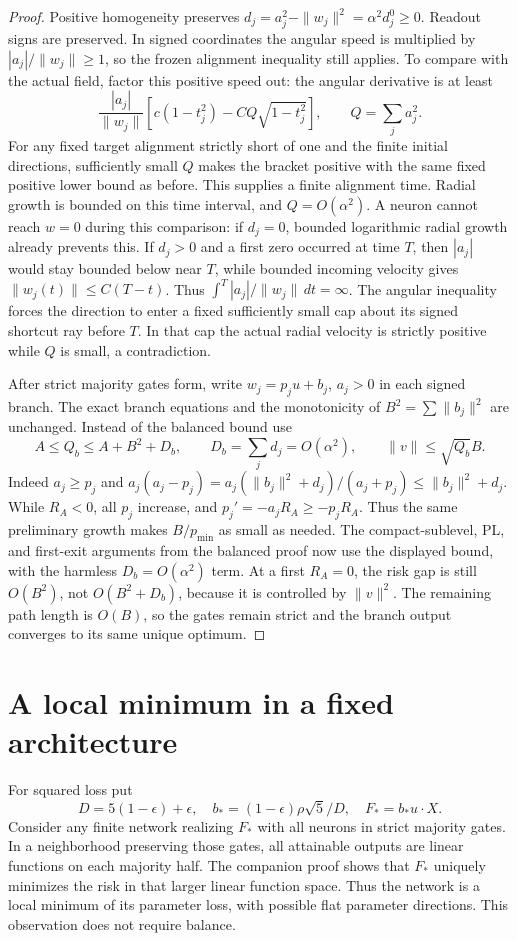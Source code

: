 \documentclass[11pt]{article}
\begin{document}
\begin{proof}
Positive homogeneity preserves
$d_j=a_j^2-\|w_j\|^2=\alpha^2d_j^0\ge0$.
Readout signs are preserved. In signed coordinates the angular speed
is multiplied by $|a_j|/\|w_j\|\ge1$, so the frozen alignment
inequality still applies. To compare with the actual field, factor
this positive speed out: the angular derivative is at least
\[
 \frac{|a_j|}{\|w_j\|}
 [c(1-t_j^2)-C Q\sqrt{1-t_j^2}],\qquad Q=\sum_j a_j^2.
\]
For any fixed target alignment strictly short of one and the finite
initial directions, sufficiently small $Q$ makes the bracket positive
with the same fixed positive lower bound as before. This supplies a
finite alignment time. Radial growth is bounded on this time interval,
and $Q=O(\alpha^2)$. A neuron cannot reach $w=0$ during this comparison:
if $d_j=0$, bounded logarithmic radial growth already prevents this.
If $d_j>0$ and a first zero occurred at time $T$, then $|a_j|$ would
stay bounded below near $T$, while bounded incoming velocity gives
$\|w_j(t)\|\le C(T-t)$. Thus
$\int^T|a_j|/\|w_j\|\,dt=\infty$. The angular inequality forces
the direction to enter a fixed sufficiently small cap about its signed
shortcut ray before $T$. In that cap the actual radial velocity is
strictly positive while $Q$ is small, a contradiction.

After strict majority gates form, write $w_j=p_j u+b_j$, $a_j>0$ in
each signed branch. The exact branch equations and the monotonicity of
$B^2=\sum\|b_j\|^2$ are unchanged. Instead of the balanced bound use
\[
 A\le Q_b\le A+B^2+D_b,\qquad
 D_b=\sum_jd_j=O(\alpha^2),\qquad
 \|v\|\le\sqrt{Q_b}B.
\]
Indeed $a_j\ge p_j$ and
$a_j(a_j-p_j)=a_j(\|b_j\|^2+d_j)/(a_j+p_j)
\le\|b_j\|^2+d_j$.
While $R_A<0$, all $p_j$ increase, and $p_j'=-a_jR_A\ge-p_jR_A$.
Thus the same preliminary growth makes $B/p_{\min}$ as small as
needed. The compact-sublevel, PL, and first-exit arguments from the
balanced proof now use the displayed bound, with the harmless
$D_b=O(\alpha^2)$ term. At a first $R_A=0$, the risk gap is still
$O(B^2)$, not $O(B^2+D_b)$, because it is controlled by $\|v\|^2$.
The remaining path length is $O(B)$, so the gates remain strict and
the branch output converges to its same unique optimum.
\end{proof}

\section{A local minimum in a fixed architecture}
For squared loss put
\[
 D=5(1-\epsilon)+\epsilon,\quad
 b_*=(1-\epsilon)\rho\sqrt5/D,\quad F_*=b_*u\cdot X.
\]
Consider any finite network realizing $F_*$ with all neurons in strict
majority gates. In a neighborhood preserving those gates, all attainable
outputs are linear functions on each majority half. The companion proof
shows that $F_*$ uniquely minimizes the risk in that larger linear
function space. Thus the network is a local minimum of its parameter
loss, with possible flat parameter directions. This observation does
not require balance.
\end{document}
